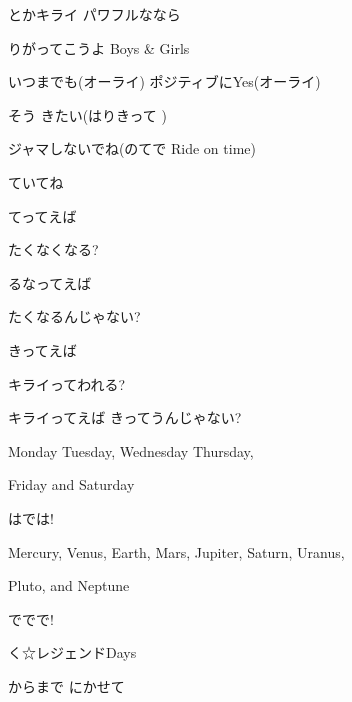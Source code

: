 \documentclass[14pt]{extreport}
\begin{document}
{  とかキライ パワフルななら
  \jisho{}

  りがってこうよ Boys \& Girls
  \jisho{}

  いつまでも(オーライ) ポジティブにYes(オーライ)
  \jisho{}

  そう きたい(はりきって )
  \jisho{}

  ジャマしないでね(のてで Ride on time)
  \jisho{}

  ていてね
  \jisho{}

\item
  てってえば
  \jisho{}

  たくなくなる?
  \jisho{}

  るなってえば
  \jisho{}

  たくなるんじゃない?
  \jisho{}

  きってえば
  \jisho{}

  キライってわれる?
  \jisho{}

  キライってえば きってうんじゃない?
  \jisho{}

\item
  \jisho{}

  Monday Tuesday, Wednesday Thursday,
  \jisho{}

  Friday and Saturday
  \jisho{}

  はでは!
  \jisho{}

  \jisho{}

  Mercury, Venus, Earth, Mars, Jupiter, Saturn, Uranus,
  \jisho{}

  Pluto, and Neptune
  \jisho{}

  ででで!
  \jisho{}

  く☆レジェンドDays
  \jisho{}

\item
  からまで にかせて
  \jisho{}

}
\end{document}
